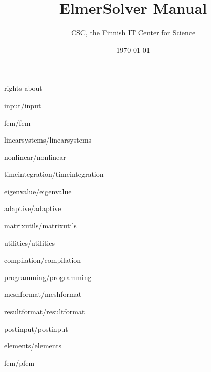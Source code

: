 \documentclass[a4paper,english]{report}    %
\title{\Huge{\bf ElmerSolver Manual}}
\author{CSC, the Finnish IT Center for Science}
\date{\today}
\newcommand{\Include}{}
\begin{document}
\maketitle

\begin{versiona}
\Include{rights}
\Include{about}

\pagestyle{empty}
\setcounter{secnumdepth}{2}
\setcounter{tocdepth}{1}  
\tableofcontents

\newpage
\pagestyle{fancy}

\end{versiona}



\graphicspath{{./}{input/}}
\Include{input/input}

\begin{versiona}
\graphicspath{{./}{fem/}}
\Include{fem/fem}
\end{versiona}

\graphicspath{{./}{linearsystems/}}
\Include{linearsystems/linearsystems}

\graphicspath{{./}{nonlinear/}}
\Include{nonlinear/nonlinear}

\graphicspath{{./}{timeintegration/}}
\Include{timeintegration/timeintegration}

\graphicspath{{./}{eigenvalue/}}
\Include{eigenvalue/eigenvalue}

\graphicspath{{./}{adaptive/}}
\Include{adaptive/adaptive}

\graphicspath{{./}{matrixutils/}}
\Include{matrixutils/matrixutils}

\graphicspath{{./}{utilities/}}
\Include{utilities/utilities}

\begin{versiona}


\graphicspath{{./}{compilation/}}
\Include{compilation/compilation}

\graphicspath{{./}{programming/}}
\Include{programming/programming}



\appendix


\graphicspath{{./}{meshformat/}}
\Include{meshformat/meshformat}

\graphicspath{{./}{resultformat/}}
\Include{resultformat/resultformat}

\graphicspath{{./}{postinput/}}
\Include{postinput/postinput}

\graphicspath{{./}{elements/}}
\Include{elements/elements}

\graphicspath{{./}{fem/}}
\Include{fem/pfem}

\end{versiona}
\end{document}
